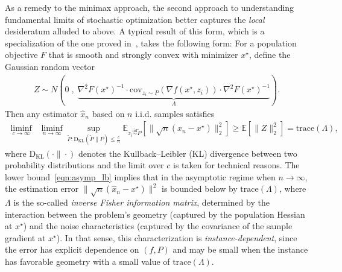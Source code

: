 \documentclass[11pt,twoside]{article}
\numberwithin{equation}{section}
\newcommand{\EE}{\mathbb{E}}
\newcommand{\trace}[1]{\mathrm{trace}\left(#1\right)}
\newcommand{\1}{\mathbf{1}}
\theoremstyle{remark}
\theoremstyle{plain}
\newcommand{\cov}{\mathrm{cov}}
\begin{document}
    As a remedy to the minimax approach, the second approach to understanding fundamental limits of stochastic optimization better captures the \emph{local} desideratum alluded to above.
    A typical result of this form, which is a specialization of the one proved in~\cite{duchi2021asymptotic}, takes the following form: For a population objective $F$ that is smooth and strongly convex with minimizer $x^\star$, define the Gaussian random vector 
	\begin{align} \label{eq:Gaussian-covariance}
Z\sim N\left(0\;,\; \underbrace{\nabla^2 F(x^\star)^{-1} \cdot \cov_{z_i\sim P}(\nabla f(x^\star, z_i)) \cdot  \nabla^2 F(x^\star)^{-1}}_{\Lambda}\right).
\end{align}
	Then any estimator $\widehat x_n$ based on $n$ i.i.d. samples satisfies
	\begin{align}\label{eqn:asymp_lb}
	\liminf_{c \rightarrow \infty}\;\; \liminf_{n\rightarrow \infty} \sup_{\tilde P \colon \mathrm{D_{KL}}(\tilde P \| P) \le \frac{c}{n}} \EE_{z_i\overset{\mathrm{iid}}{\sim} \tilde P}[ \| \sqrt{n}(\widehat x_n - x^\star) \|^2_2 ] \ge \EE[\| Z \|^2_2] = \trace{\Lambda},
	\end{align}
	where $\mathrm{D_{KL}}(\cdot \| \cdot)$ denotes the Kullback–Leibler (KL) divergence between two probability distributions and the limit over $c$ is taken for technical reasons. 
	The lower bound~\eqref{eqn:asymp_lb} implies that in the asymptotic regime when $n \rightarrow \infty$, the estimation error $\|\sqrt{n} (\widehat x_n - x^\star)\|^2$ is bounded below by $\trace{\Lambda}$, where $\Lambda$  is the so-called \emph{inverse Fisher information matrix}, determined by the interaction between the problem's geometry (captured by the population Hessian at $x^\star$) and the noise characteristics (captured by the covariance of the sample gradient at $x^\star$). In that sense, this characterization is \emph{instance-dependent}, since the error has explicit dependence on $(f, P)$ and may be small when the instance has favorable geometry with a small value of $\trace{\Lambda}$. %
	
\end{document}
